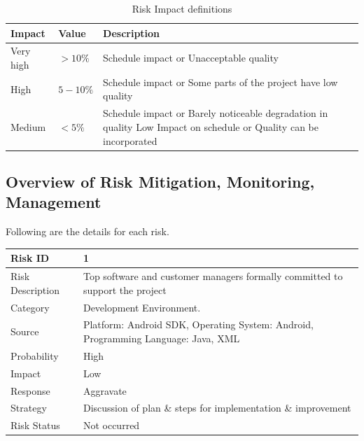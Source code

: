 \documentclass[12pt,a4paper]{report}
\begin{document}
	\begin{table}[!h]
		\center
		
			\begin{tabular}{|p{3cm}|p{2cm}|p{8.8cm}|}
				\hline
				Impact & Value	& Description \\ \hline
				Very high &	$> 10 \%$ & Schedule impact or Unacceptable 
				quality \\ \hline
				High &	$5-10 \%$ & Schedule impact or Some parts of the project have low quality \\ \hline
				Medium	& $ < 5 \% $ & Schedule impact or Barely noticeable degradation in quality Low	Impact 
				on schedule or Quality
				 can be incorporated \\ \hline
			\end{tabular}
		\caption{Risk Impact definitions}

	\end{table}
\newpage
\subsection{Overview of Risk Mitigation, Monitoring, Management}

Following are the details for each risk.
\begin{table}[!h]
	\center
	
		\begin{tabular}{|p{3.5cm}|p{9cm}|}
			\hline 
			Risk ID	& 1 \\ \hline
			Risk Description	& Top software and customer managers formally committed to support the project \\ \hline
			Category	& Development Environment. \\ \hline
			Source	& Platform: Android SDK, \newline Operating System: Android, \newline Programming Language: Java, XML
			\\ \hline
			Probability	& High \\ \hline
			Impact	& Low \\ \hline
			Response	& Aggravate \\ \hline
			Strategy	& Discussion of plan \& steps for implementation \& improvement\\ \hline
			Risk Status	& Not occurred \\ \hline
		\end{tabular}
	
\end{table}
\end{document}
